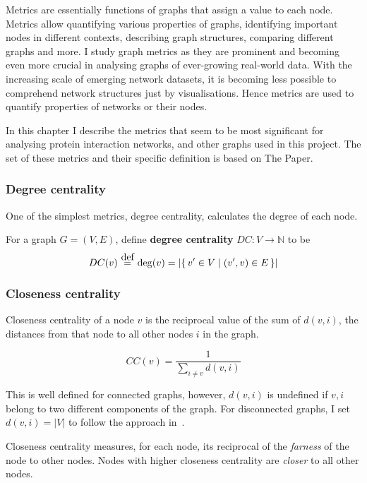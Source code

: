 Metrics are essentially functions of graphs that assign a value to each node.
Metrics allow quantifying various properties of graphs, identifying important nodes in different contexts, describing graph structures, comparing different graphs and more.
I study graph metrics as they are prominent and becoming even more crucial in analysing graphs of ever-growing real-world data.
With the increasing scale of emerging network datasets, it is becoming less possible to comprehend network structures just by visualisations.
Hence metrics are used to quantify properties of networks or their nodes.

In this chapter I describe the metrics that seem to be most significant for analysing protein interaction networks, and other graphs used in this project. The set of these metrics and their specific definition is based on The Paper\cite{Bozhilova2019}.

\subsubsection{Degree centrality}

One of the simplest metrics, degree centrality, calculates the degree of each node.

\begin{definition}
    For a graph $G = (V, E)$, define \textbf{degree centrality} $DC : V \rightarrow \mathbb{N}$ to be
    \[ DC(v) \eqdef \deg(v) = \left| \Set{v' \in V}{(v', v) \in E} \right| \]
\end{definition}

\subsubsection{Closeness centrality}

Closeness centrality of a node $v$ is the reciprocal value of the sum of $d(v, i)$, the distances from that node to all other nodes $i$ in the graph.

\[CC(v) = \frac{1}{\sum_{i \neq v} d(v, i)}\]

This is well defined for connected graphs, however, $d(v, i)$ is undefined if $v, i$ belong to two different components of the graph. For disconnected graphs, I set $d(v, i) = |V|$ to follow the approach in~\cite{Bozhilova2019}.

Closeness centrality measures, for each node, its reciprocal of the \textsl{farness} of the node to other nodes. Nodes with higher closeness centrality are \textsl{closer} to all other nodes.

